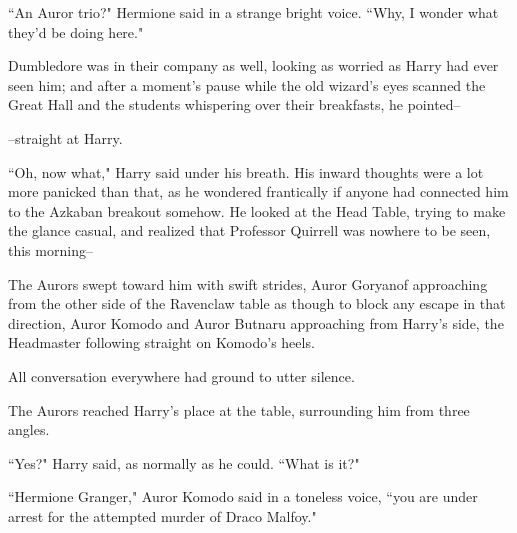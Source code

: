 ``An Auror trio?" Hermione said in a strange bright voice. ``Why, I wonder what they'd be doing here."

Dumbledore was in their company as well, looking as worried as Harry had ever seen him; and after a moment's pause while the old wizard's eyes scanned the Great Hall and the students whispering over their breakfasts, he pointed\---

\---straight at Harry.

``Oh, now what," Harry said under his breath. His inward thoughts were a lot more panicked than that, as he wondered frantically if anyone had connected him to the Azkaban breakout somehow. He looked at the Head Table, trying to make the glance casual, and realized that Professor Quirrell was nowhere to be seen, this morning\---

The Aurors swept toward him with swift strides, Auror Goryanof approaching from the other side of the Ravenclaw table as though to block any escape in that direction, Auror Komodo and Auror Butnaru approaching from Harry's side, the Headmaster following straight on Komodo's heels.

All conversation everywhere had ground to utter silence.

The Aurors reached Harry's place at the table, surrounding him from three angles.

``Yes?" Harry said, as normally as he could. ``What is it?"

``Hermione Granger," Auror Komodo said in a toneless voice, ``you are under arrest for the attempted murder of Draco Malfoy."

